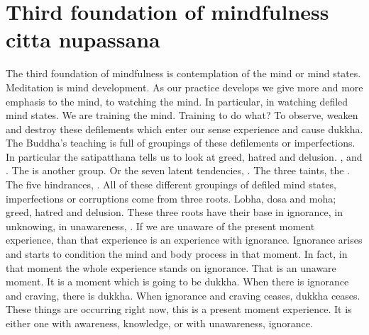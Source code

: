 \documentclass[letterpaper,10pt,english]{sphinxmanual}
\begin{document}
\section{Third foundation of mindfulness citta nupassana}
\label{\detokenize{4-b:third-foundation-of-mindfulness-citta-nupassana}}
\sphinxAtStartPar
The third foundation of mindfulness is contemplation of the mind or
mind states. Meditation is mind development. As our practice develops we
give  more  and  more  emphasis  to  the  mind,  to  watching  the  mind.  In  particular, in watching defiled mind states. We are training the mind. Training
to do what? To observe, weaken and destroy these defilements which enter
our  sense  experience  and  cause  dukkha.  The  Buddha’s  teaching  is  full  of
groupings  of  these  defilements  or  imperfections.  In  particular  the  satipatthana tells us to look at greed, hatred and delusion.
,
and
.
The
is another group. Or the seven latent tendencies,
. The
three taints, the
. The five hindrances,
. All of these different
groupings  of  defiled  mind  states,  imperfections  or  corruptions  come  from
three roots. Lobha, dosa and moha; greed, hatred and delusion. These three
roots have their base in ignorance, in unknowing, in unawareness,
. If
we are unaware of the present moment experience, than that experience is an
experience with ignorance. Ignorance arises and starts to condition the mind
and body process in that moment. In fact, in that moment the whole experience stands on ignorance. That is an unaware moment. It is a moment which
is going to be dukkha. When there is ignorance and craving, there is dukkha.
When ignorance and craving ceases, dukkha ceases.
These things
are occurring right now, this is a present moment experience. It is either one
with awareness, knowledge, or with unawareness, ignorance.
\end{document}
